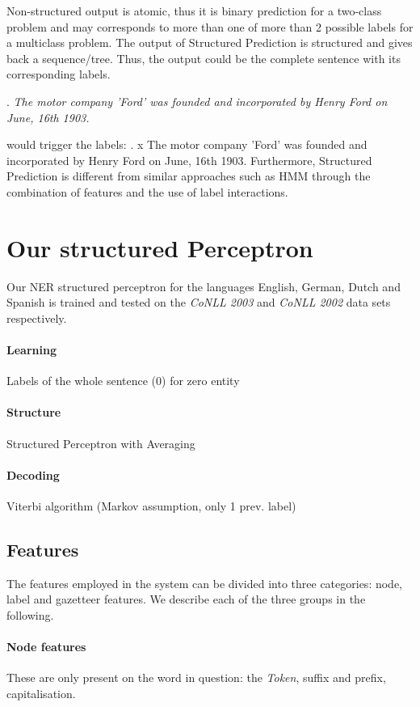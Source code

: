 \documentclass[11pt]{article}
\begin{document}
Non-structured output is atomic, thus it is binary prediction for a two-class problem and may corresponds to more than one of more than 2 possible labels for a 
multiclass problem. 
The output of Structured Prediction is structured and gives back a sequence/tree. 
Thus, the output could be the complete sentence with its corresponding labels. 

\ex. \emph{The motor company 'Ford' was founded and incorporated  by Henry Ford on June, 16th 1903.} \label{PredEx1a}

would trigger the labels: 
\ex. x The motor company 'Ford' was founded and incorporated  by Henry Ford on June, 16th 1903. \label{PredEx1b} %
Furthermore, Structured Prediction is different from similar approaches such as HMM through the combination of features and the use of label interactions.


\section{Our structured Perceptron}
Our NER structured perceptron for the languages English, German, Dutch and Spanish is trained and tested on the \emph{CoNLL 2003} and \emph{CoNLL 2002} data sets
respectively. 

\paragraph*{Learning}
Labels of the whole sentence (0) for zero entity
\paragraph*{Structure}
Structured Perceptron with Averaging

\paragraph*{Decoding}
Viterbi algorithm (Markov assumption, only 1 prev.
label)

\subsection*{Features}
The features employed in the system can be divided into three categories: node, label and gazetteer features. 
We describe each of the three groups in the following.

\paragraph*{Node features}
These are only present on the word in question: the \emph{Token}, suffix and prefix, capitalisation.
\end{document}
